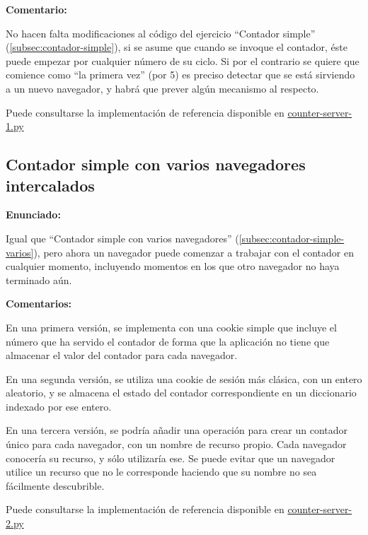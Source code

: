 \textbf{Comentario:}

No hacen falta modificaciones al código del ejercicio ``Contador simple'' (\ref{subsec:contador-simple}), si se asume que cuando se invoque el contador, éste puede empezar por cualquier número de su ciclo. Si por el contrario se quiere que comience como ``la primera vez'' (por 5) es preciso detectar que se está sirviendo a un nuevo navegador, y habrá que prever algún mecanismo al respecto.

Puede consultarse la implementación de referencia disponible en
\href{https://github.com/CursosWeb/Code/blob/master/Python-Web/counter/counter-server-1.py}{counter-server-1.py}

\subsection{Contador simple con varios navegadores intercalados}
\label{subsec:contador-simple-varios-intercalados}

\textbf{Enunciado:}

Igual que ``Contador simple con varios navegadores'' (\ref{subsec:contador-simple-varios}), pero ahora un navegador puede comenzar a trabajar con el contador en cualquier momento, incluyendo momentos en los que otro navegador no haya terminado aún.

\textbf{Comentarios:}

En una primera versión, se implementa con una cookie simple que incluye el número que ha servido el contador de forma que la aplicación no tiene que almacenar el valor del contador para cada navegador.

En una segunda versión, se utiliza una cookie de sesión más clásica, con un entero aleatorio, y se almacena el estado del contador correspondiente en un diccionario indexado por ese entero.

En una tercera versión, se podría añadir una operación para crear un contador único para cada navegador, con un nombre de recurso propio. Cada navegador conocería su recurso, y sólo utilizaría ese. Se puede evitar que un navegador utilice un recurso que no le corresponde haciendo que su nombre no sea fácilmente descubrible.

Puede consultarse la implementación de referencia disponible en
\href{https://github.com/CursosWeb/Code/blob/master/Python-Web/counter/counter-server-2.py}{counter-server-2.py}

